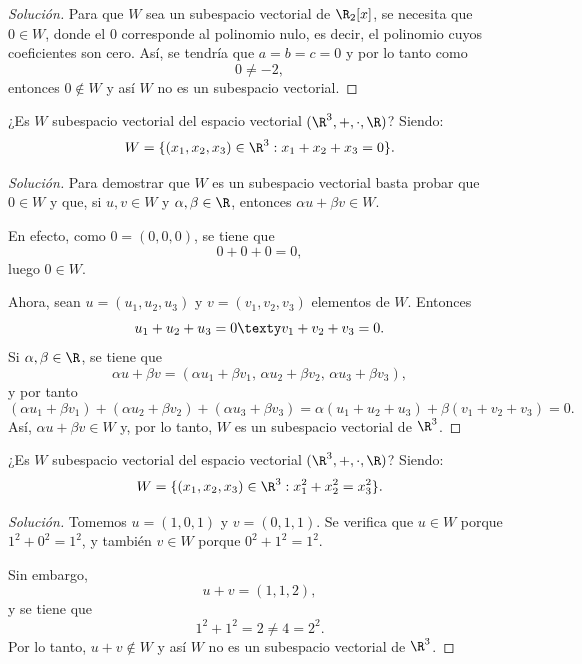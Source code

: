 \documentclass[a4,11pt]{aleph-notas}
\begin{document}
\begin{proof}[Solución]\hspace{0pt}
    Para que $W$ sea un subespacio vectorial de $\R_2[x]$, se necesita que $0\in W$, donde el $0$ corresponde al polinomio nulo, es decir, el polinomio cuyos coeficientes son cero. Así, se tendría que $a=b=c=0$ y por lo tanto como
    \[
         0 \neq -2,
    \]
    entonces $0\notin W$ y así $W$ no es un subespacio vectorial. 
\end{proof}

\begin{ejer}
    ¿Es $W$ subespacio vectorial del espacio vectorial $(\R^3, + , \cdot, \R)$? Siendo:
    \[
    W = \{(x_1,x_2,x_3)\in\R^3 : x_1+x_2+x_3=0\}.
    \]
\end{ejer}

\begin{proof}[Solución]\hspace{0pt}
    Para demostrar que $W$ es un subespacio vectorial basta probar que $0\in W$ y que, si $u,v\in W$ y $\alpha,\beta\in\R$, entonces $\alpha u+\beta v\in W$.

    En efecto, como $0=(0,0,0)$, se tiene que
    \[
        0+0+0=0,
    \]
    luego $0\in W$.

    Ahora, sean $u=(u_1,u_2,u_3)$ y $v=(v_1,v_2,v_3)$ elementos de $W$. Entonces
    \[
        u_1+u_2+u_3=0
        \texty
        v_1+v_2+v_3=0.
    \]
    Si $\alpha,\beta\in\R$, se tiene que
    \[
        \alpha u+\beta v=(\alpha u_1+\beta v_1,\,\alpha u_2+\beta v_2,\,\alpha u_3+\beta v_3),
    \]
    y por tanto
    \[
        (\alpha u_1+\beta v_1)+(\alpha u_2+\beta v_2)+(\alpha u_3+\beta v_3)
        =\alpha(u_1+u_2+u_3)+\beta(v_1+v_2+v_3)=0.
    \]
    Así, $\alpha u+\beta v\in W$ y, por lo tanto, $W$ es un subespacio vectorial de $\R^3$.
\end{proof}

\begin{ejer}
    ¿Es $W$ subespacio vectorial del espacio vectorial $(\R^3, + , \cdot, \R)$? Siendo:
    \[
    W = \{(x_1,x_2,x_3)\in\R^3 : x_1^2+x_2^2=x_3^2\}.
    \]
\end{ejer}

\begin{proof}[Solución]\hspace{0pt}
    Tomemos $u=(1,0,1)$ y $v=(0,1,1)$. Se verifica que $u\in W$ porque $1^2+0^2=1^2$, y también $v\in W$ porque $0^2+1^2=1^2$.

    Sin embargo,
    \[
        u+v=(1,1,2),
    \]
    y se tiene que
    \[
        1^2+1^2=2\neq 4=2^2.
    \]
    Por lo tanto, $u+v\notin W$ y así $W$ no es un subespacio vectorial de $\R^3$.
\end{proof}
\end{document}
